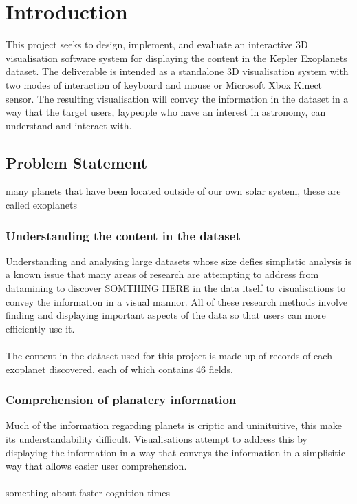 \chapter{Introduction}\label{C:intro}
This project seeks to design, implement, and evaluate an interactive 3D visualisation software system for displaying the content in the Kepler Exoplanets dataset. The deliverable is intended as a standalone 3D visualisation system with two modes of interaction of keyboard and mouse or Microsoft Xbox Kinect sensor. The resulting visualisation will convey the information in the dataset in a way that the target users, laypeople who have an interest in astronomy, can understand and interact with.

\section{Problem Statement}
many planets that have been located outside of our own solar system, these are
called exoplanets
\subsection{Understanding the content in the dataset}
Understanding and analysing large datasets whose size defies simplistic analysis is a known issue that many areas of research are attempting to address from datamining to discover SOMTHING HERE in the data itself to visualisations to convey the information in a visual mannor. All of these research methods involve finding and displaying important aspects of the data so that users can more efficiently use it.
\\\\
The content in the dataset used for this project is made up of records of each exoplanet discovered, each of which contains 46 fields.

\subsection{Comprehension of planatery information}
Much of the information regarding planets is criptic and uninituitive, this make its understandability difficult. Visualisations attempt to address this by displaying the information in a way that conveys the information in a simplisitic way that allows easier user comprehension.
\\\\
something about faster cognition times

